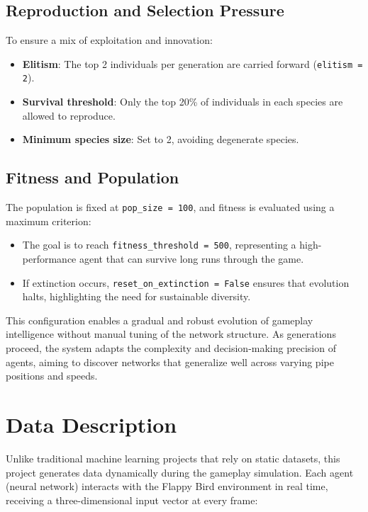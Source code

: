 \documentclass[sigconf]{acmart}
\begin{document}
\subsection{Reproduction and Selection Pressure}
To ensure a mix of exploitation and innovation:
\begin{itemize}
  \item \textbf{Elitism}: The top 2 individuals per generation are carried forward (\texttt{elitism = 2}).
  \item \textbf{Survival threshold}: Only the top 20\% of individuals in each species are allowed to reproduce.
  \item \textbf{Minimum species size}: Set to 2, avoiding degenerate species.
\end{itemize}

\subsection{Fitness and Population}
The population is fixed at \texttt{pop\_size = 100}, and fitness is evaluated using a maximum criterion:
\begin{itemize}
  \item The goal is to reach \texttt{fitness\_threshold = 500}, representing a high-performance agent that can survive long runs through the game.
  \item If extinction occurs, \texttt{reset\_on\_extinction = False} ensures that evolution halts, highlighting the need for sustainable diversity.
\end{itemize}

This configuration enables a gradual and robust evolution of gameplay intelligence without manual tuning of the network structure. As generations proceed, the system adapts the complexity and decision-making precision of agents, aiming to discover networks that generalize well across varying pipe positions and speeds.


\section{Data Description}
Unlike traditional machine learning projects that rely on static datasets, this project generates data dynamically during the gameplay simulation. Each agent (neural network) interacts with the Flappy Bird environment in real time, receiving a three-dimensional input vector at every frame:
\end{document}
